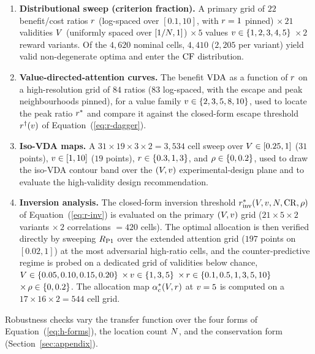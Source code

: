 \begin{enumerate}
\item \textbf{Distributional sweep (criterion fraction).} A primary grid
  of $22$ benefit/cost ratios $r$ (log-spaced over $[0.1, 10]$,
  with $r = 1$ pinned) $\times\,21$ validities $V$ (uniformly
  spaced over $[1/N, 1]$) $\times\,5$ values $v \in \{1, 2, 3, 4,
  5\}$ $\times\,2$ reward variants. Of the $4{,}620$ nominal cells,
  $4{,}410$ ($2{,}205$ per variant) yield valid non-degenerate optima
  and enter the $\mathrm{CF}$ distribution.
\item \textbf{Value-directed-attention curves.} The benefit $\mathrm{VDA}$ as a
  function of $r$ on a high-resolution grid of $84$ ratios
  ($83$ log-spaced, with the escape and peak neighbourhoods pinned), for
  a value family $v \in \{2, 3, 5, 8, 10\}$, used to locate the peak
  ratio
  $r^{*}$ and compare it against the closed-form escape threshold
  $r^{\dagger}(v)$ of Equation~(\ref{eq:r-dagger}).
\item \textbf{Iso-VDA maps.} A $31 \times 19 \times 3 \times 2 = 3{,}534$
  cell sweep over $V \in [0.25, 1]$ ($31$ points), $v \in [1, 10]$
  ($19$ points), $r \in \{0.3, 1, 3\}$, and $\rho \in \{0, 0.2\}$,
  used to draw the iso-VDA contour band over the $(V, v)$
  experimental-design plane and to evaluate the high-validity design
  recommendation.
\item \textbf{Inversion analysis.} The closed-form inversion threshold
  $r^{*}_{\mathrm{inv}}(V, v, N, \mathrm{CR}, \rho)$ of
  Equation~(\ref{eq:r-inv}) is evaluated on the primary
  $(V, v)$ grid ($21 \times 5 \times 2$ variants $\times\, 2$
  correlations $= 420$ cells). The optimal allocation is then verified
  directly by sweeping $R_{\mathrm{P1}}$ over the extended attention grid
  ($197$ points on $[0.02, 1]$) at the most adversarial high-ratio
  cells, and the counter-predictive regime is probed on a dedicated
  grid of validities below chance, $V \in \{0.05, 0.10, 0.15,
  0.20\}$ $\times\,v \in \{1, 3, 5\}$ $\times\,r \in \{0.1, 0.5,
  1, 3, 5, 10\}$ $\times\,\rho \in \{0, 0.2\}$. The allocation map
  $\alpha_c^{*}(V, r)$ at $v = 5$ is computed on a
  $17 \times 16 \times 2 = 544$ cell grid.
\end{enumerate}

Robustness checks vary the transfer function over the four forms of
Equation~(\ref{eq:h-forms}), the location count $N$, and the
conservation form (Section~\ref{sec:appendix}).

